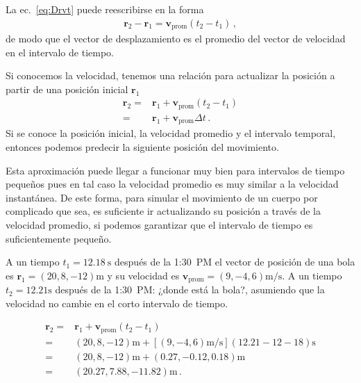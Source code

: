 
La ec.~\eqref{eq:Drvt} puede reescribirse en la forma
\begin{align*}
  \mathbf{r}_2-\mathbf{r}_1=\mathbf{v}_{\text{prom}}(t_2-t_1)\,,
\end{align*}
de modo que el vector de desplazamiento es el promedio del vector de velocidad en el intervalo de tiempo.

Si conocemos la velocidad, tenemos una relación para actualizar la posición a partir de una posición inicial $\mathbf{r}_1$
\begin{align*}
  \mathbf{r}_2=&\mathbf{r}_1+\mathbf{v}_{\text{prom}}(t_2-t_1)\nonumber\\
=&\mathbf{r}_1+\mathbf{v}_{\text{prom}}\Delta t\,.
\end{align*}
Si se conoce la posición inicial, la velocidad promedio y el intervalo temporal, entonces podemos predecir la siguiente posición del movimiento.

Esta aproximación puede llegar a funcionar muy bien para intervalos de
tiempo pequeños pues en tal caso la velocidad promedio es muy similar
a la velocidad instantánea. De este forma, para simular el movimiento
de un cuerpo por complicado que sea, es suficiente ir actualizando su
posición a través de la velocidad promedio, si podemos garantizar que
el intervalo de tiempo es suficientemente pequeño.

\ejemplo{}
\begin{frame}[plain]
A un tiempo $t_1=\SI{12.18}{\second}$ después de la 1:30~PM el vector de posición de una bola es $\mathbf{r}_1=(20,8,-12)\si{\meter}$ y su velocidad es $\mathbf{v}_{\text{prom}}=(9,-4,6)\si{\meter\per\second}$. A un tiempo $t_2=12.21\si{\second}$ después de la 1:30~PM: ¿donde está la bola?, asumiendo que la velocidad no cambie en el corto intervalo de tiempo.

  
  \begin{align*}
  \mathbf{r}_2=&\mathbf{r}_1+\mathbf{v}_{\text{prom}}(t_2-t_1)\nonumber\\
  =&(20,8,-12)\si{\meter} +  \left[(9,-4,6)\si{\meter\per\second}\right](12.21-12-18)\si{\second}\nonumber\\
  =&(20,8,-12)\si{\meter}+(0.27,-0.12,0.18)\si{\meter}\nonumber\\
=&(20.27,7.88,-11.82)\si{\meter}\,.
  \end{align*}
\end{frame}
\finejemplo


